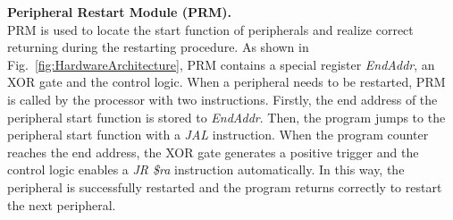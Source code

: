 \vspace{5pt}
\noindent\textbf{Peripheral Restart Module (PRM).} \\
PRM is used to locate the start function of peripherals and realize correct returning during the restarting procedure.
As shown in Fig.~\ref{fig:HardwareArchitecture}, PRM contains a special register \emph{EndAddr}, an XOR gate and the control logic.
When a peripheral needs to be restarted, PRM is called by the processor with two instructions.
Firstly, the end address of the peripheral start function is stored to \emph{EndAddr}.
Then, the program jumps to the peripheral start function with a \emph{JAL} instruction.
When the program counter reaches the end address, the XOR gate generates a positive trigger and the control logic enables a \emph{JR \$ra} instruction automatically.
In this way, the peripheral is successfully restarted and the program returns correctly to restart the next peripheral.